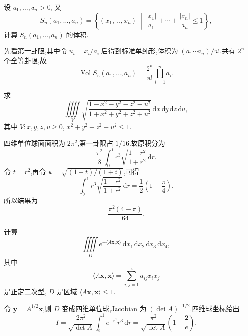 \begin{example}
    设 $a_1,\ldots,a_n>0$, 又
    \[
        S_n(a_1,\ldots,a_n)=\left\{(x_1,\ldots,x_n)\ \middle|\ \dfrac{|x_1|}{a_1}+\cdots+\dfrac{|x_n|}{a_n}\leq1\right\},
    \]
    计算 $S_n(a_1,\ldots,a_n)$ 的体积.
\end{example}
\exampleblank

\begin{solution}
    先看第一卦限,其中令 $u_i=x_i/a_i$ 后得到标准单纯形,体积为 $(a_1\cdots a_n)/n!$.共有 $2^n$ 个全等卦限,故
    \[
        \operatorname{Vol}S_n(a_1,\ldots,a_n)=\dfrac{2^n}{n!}\prod_{i=1}^na_i.
    \]
\end{solution}

\begin{example}
    求
    \[
        \iiiint\limits_V\sqrt{\dfrac{1-x^2-y^2-z^2-u^2}{1+x^2+y^2+z^2+u^2}}\,
        \mathrm{d}x\,\mathrm{d}y\,\mathrm{d}z\,\mathrm{d}u,
    \]
    其中 $V:x,y,z,u\geq0$, $x^2+y^2+z^2+u^2\leq1$.
\end{example}
\exampleblank

\begin{solution}
    四维单位球面面积为 $2\pi^2$,第一卦限占 $1/16$.故原积分为
    \[
        \dfrac{\pi^2}{8}\int_0^1r^3\sqrt{\dfrac{1-r^2}{1+r^2}}\,\mathrm{d}r.
    \]
    令 $t=r^2$,再令 $u=\sqrt{(1-t)/(1+t)}$,可得
    \[
        \displaystyle\int_0^1r^3\sqrt{\dfrac{1-r^2}{1+r^2}}\,\mathrm{d}r
        =\dfrac{1}{2}\left(1-\dfrac{\pi}{4}\right).
    \]
    所以结果为
    \[
        \dfrac{\pi^2(4-\pi)}{64}.
    \]
\end{solution}

\begin{example}
    计算
    \[
        \iiiint\limits_De^{-\langle A\bm{x},\bm{x}\rangle}\,
        \mathrm{d}x_1\,\mathrm{d}x_2\,\mathrm{d}x_3\,\mathrm{d}x_4,
    \]
    其中
    \[
        \langle A\bm{x},\bm{x}\rangle=\sum\limits_{i,j=1}^4a_{ij}x_ix_j
    \]
    是正定二次型, $D$ 是区域 $\langle A\bm{x},\bm{x}\rangle\leq1$.
\end{example}
\exampleblank

\begin{solution}
    令 $\bm y=A^{1/2}\bm x$,则 $D$ 变成四维单位球,Jacobian 为 $(\det A)^{-1/2}$.四维球坐标给出
    \[
        I=\dfrac{2\pi^2}{\sqrt{\det A}}\int_0^1e^{-r^2}r^3\,\mathrm{d}r
        =\dfrac{\pi^2}{\sqrt{\det A}}\left(1-\dfrac{2}{e}\right).
    \]
\end{solution}

